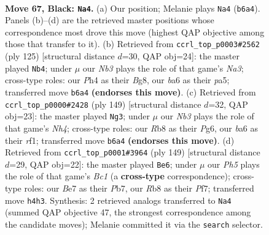 \documentclass[11pt]{article}
\begin{document}
\clearpage

\begin{figure}[p]\centering
\begin{subfigure}{0.46\textwidth}\centering
\resizebox{\linewidth}{!}{%
\newchessgame
\chessboard[
  setfen={1r6/4b1k1/Bn1p3p/B3p3/4P2p/5P2/5K2/7R b - - 4 67},
  showmover=false,
  pgfstyle=straightmove, color=movearrow, markmove={b6-a4}
]}
\caption{}
\end{subfigure}\hfill
\begin{subfigure}{0.46\textwidth}\centering
\resizebox{\linewidth}{!}{%
\newchessgame
\chessboard[
  setfen={6b1/1B6/n2r2pk/P3R2p/2p4P/2N5/6PK/8 b - - 16 63},
  showmover=false,
  pgfstyle=straightmove, color=movearrow, markmove={a6-b4}
]}
\caption{}
\end{subfigure}
\\[4pt]
\begin{subfigure}{0.46\textwidth}\centering
\resizebox{\linewidth}{!}{%
\newchessgame
\chessboard[
  setfen={8/4k3/3p2p1/2p1b2n/2P3B1/1P1K4/8/5R2 b - - 22 75},
  showmover=false,
  pgfstyle=straightmove, color=movearrow, markmove={h5-g3}
]}
\caption{}
\end{subfigure}\hfill
\begin{subfigure}{0.46\textwidth}\centering
\resizebox{\linewidth}{!}{%
\newchessgame
\chessboard[
  setfen={2b3k1/1p3p2/2p3nR/8/p7/P4KN1/1P6/8 b - - 0 75},
  showmover=false,
  pgfstyle=straightmove, color=movearrow, markmove={c8-e6}
]}
\caption{}
\end{subfigure}
\caption{\textbf{Move 67, Black: \texttt{Na4}.} (a) Our position; Melanie plays \texttt{Na4} (\texttt{b6a4}). Panels (b)--(d) are the retrieved master positions whose correspondence most drove this move (highest QAP objective among those that transfer to it). (b) Retrieved from \texttt{ccrl\_top\_p0003\#2562} (ply 125) [structural distance $d$=30, QAP obj=24]: the master played \texttt{Nb4}; under $\mu$ our \emph{Nb3} plays the role of that game's \emph{Na3}; cross-type roles: our \emph{P}h4 as their \emph{B}g8, our \emph{b}a6 as their \emph{p}a5; transferred move \texttt{b6a4} \textbf{(endorses this move)}. (c) Retrieved from \texttt{ccrl\_top\_p0000\#2428} (ply 149) [structural distance $d$=32, QAP obj=23]: the master played \texttt{Ng3}; under $\mu$ our \emph{Nb3} plays the role of that game's \emph{Nh4}; cross-type roles: our \emph{R}b8 as their \emph{P}g6, our \emph{b}a6 as their \emph{r}f1; transferred move \texttt{b6a4} \textbf{(endorses this move)}. (d) Retrieved from \texttt{ccrl\_top\_p0001\#3964} (ply 149) [structural distance $d$=29, QAP obj=22]: the master played \texttt{Be6}; under $\mu$ our \emph{Ph5} plays the role of that game's \emph{Bc1} (a \textbf{cross-type} correspondence); cross-type roles: our \emph{B}e7 as their \emph{P}b7, our \emph{R}b8 as their \emph{P}f7; transferred move \texttt{h4h3}. Synthesis: 2 retrieved analogs transferred to \texttt{Na4} (summed QAP objective 47, the strongest correspondence among the candidate moves); Melanie committed it via the \texttt{search} selector.}
\label{fig:thought-m133}
\end{figure}
\end{document}
